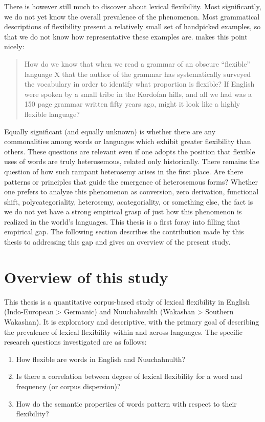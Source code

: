 There is however still much to discover about lexical flexibility. Most significantly, we do not yet know the overall prevalence of the phenomenon. Most grammatical descriptions of flexibility present a relatively small set of handpicked examples, so that we do not know how representative these examples are. \textcite[70]{Croft2001b} makes this point nicely:

\blockquote[{\cite[70]{Croft2001b}}]{How do we know that when we read a grammar of an obscure \enquote{flexible} language X that the author of the grammar has systematically surveyed the vocabulary in order to identify what proportion is flexible? If English were spoken by a small tribe in the Kordofan hills, and all we had was a 150 page grammar written fifty years ago, might it look like a highly flexible language?}

\noindent Equally significant (and equally unknown) is whether there are any commonalities among words or languages which exhibit greater flexibility than others. These questions are relevant even if one adopts the position that flexible uses of words are truly heterosemous, related only historically. There remains the question of how such rampant heterosemy arises in the first place. Are there patterns or principles that guide the emergence of heterosemous forms? Whether one prefers to analyze this phenomenon as conversion, zero derivation, functional shift, polycategoriality, heterosemy, acategoriality, or something else, the fact is we do not yet have a strong empirical grasp of just how this phenomenon is realized in the world's languages. This thesis is a first foray into filling that empirical gap. The following section describes the contribution made by this thesis to addressing this gap and gives an overview of the present study.

\section{Overview of this study}
\label{sec:1.3}

This thesis is a quantitative corpus-based study of lexical flexibility in English (Indo-European > Germanic) and Nuuchahnulth (Wakashan > Southern Wakashan). It is exploratory and descriptive, with the primary goal of describing the prevalence of lexical flexibility within and across languages. The specific research questions investigated are as follows:

\begin{enumerate}[
  label      = {\textbf{R\arabic*:}},
  leftmargin = *,
  ref        = {R\arabic*}
]
  \item\label{R1} How flexible are words in English and Nuuchahnulth?
  \item\label{R2} Is there a correlation between degree of lexical flexibility for a word and frequency (or corpus dispersion)?
  \item\label{R3} How do the semantic properties of words pattern with respect to their flexibility?
\end{enumerate}


